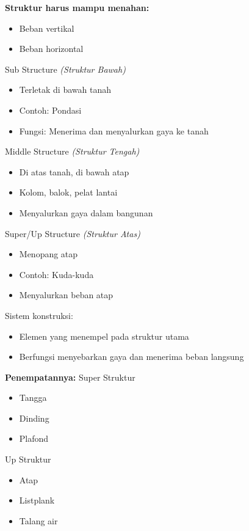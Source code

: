 \documentclass[../main.tex]{subfiles}
\begin{document}
\begin{frame}[t,mycolor=digiPH_ocean,mytitle=center,dark]

	\textbf{Struktur harus mampu menahan:}

	\begin{itemize}
		\item Beban vertikal
		\item Beban horizontal
	\end{itemize}
\end{frame}

\begin{frame}[t,mycolor=digiPH_white,mytitle=standard,light]

	\tabitem Sub Structure \textit{(Struktur Bawah)}
	\begin{itemize}
		\item Terletak di bawah tanah
		\item Contoh: Pondasi
		\item Fungsi: Menerima dan menyalurkan gaya ke tanah
	\end{itemize}

	\tabitem Middle Structure \textit{(Struktur Tengah)}
	\begin{itemize}
		\item Di atas tanah, di bawah atap
		\item Kolom, balok, pelat lantai
		\item Menyalurkan gaya dalam bangunan
	\end{itemize}

	\tabitem Super/Up Structure \textit{(Struktur Atas)}
	\begin{itemize}
		\item Menopang atap
		\item Contoh: Kuda-kuda
		\item Menyalurkan beban atap
	\end{itemize}
\end{frame}

\begin{frame}[t,mycolor=digiPH_leaf,mytitle=standard,dark]

	\tabitem Sistem konstruksi:
	\begin{itemize}
		\item Elemen yang menempel pada struktur utama
		\item Berfungsi menyebarkan gaya dan menerima beban langsung
	\end{itemize}

	\textbf{Penempatannya:}
	\tabitem Super Struktur
	\begin{itemize}
		\item Tangga
		\item Dinding
		\item Plafond
	\end{itemize}

	\tabitem Up Struktur
	\begin{itemize}
		\item Atap
		\item Listplank
		\item Talang air
	\end{itemize}
\end{frame}
\end{document}
